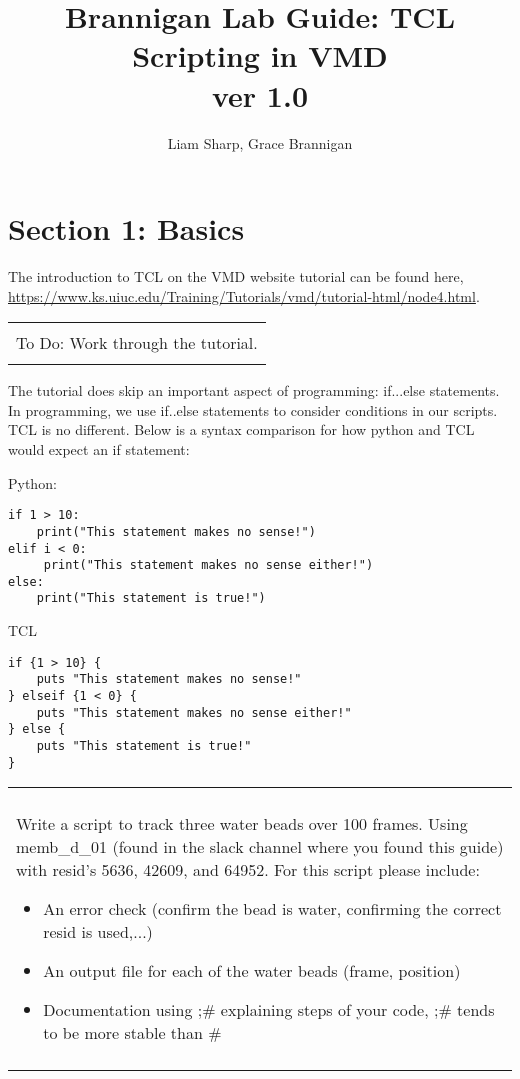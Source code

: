 \documentclass[letter,11pt]{article}
\title{{Brannigan Lab Guide: TCL Scripting in VMD }\\\large{ver 1.0}}
\author{Liam Sharp, Grace Brannigan}
\newenvironment{exercise}
    {\begin{center}
    \begin{tabular}{|p{0.9\textwidth}|}
    \hline\\
    }
    { 
    \\\\\hline
    \end{tabular} 
    \end{center}
    }
\begin{document}
 
\maketitle
\newpage
\tableofcontents
\flushbottom
\newpage
\section{Section 1: Basics}
\label{sec:intro}
The introduction to TCL on the VMD website tutorial can be found here, \url{https://www.ks.uiuc.edu/Training/Tutorials/vmd/tutorial-html/node4.html}.
\begin{exercise}
To Do: Work through the tutorial.  
\end{exercise}

The tutorial does skip an important aspect of programming: if...else statements. In programming, we use if..else statements to consider conditions in our scripts. TCL is no different. Below is a syntax comparison for how python and TCL would expect an if statement:

\vspace{0.15in}
Python:
\begin{lstlisting}
if 1 > 10:
    print("This statement makes no sense!")
elif i < 0:
     print("This statement makes no sense either!")
else:
    print("This statement is true!")
    \end{lstlisting}
    
TCL
\begin{lstlisting}
if {1 > 10} {
    puts "This statement makes no sense!"
} elseif {1 < 0} {
    puts "This statement makes no sense either!"
} else {
    puts "This statement is true!"
}
\end{lstlisting}

\begin{exercise}
Write a script to track three water beads over 100 frames. Using memb\_d\_01 (found in the slack channel where you found this guide) with resid's 5636, 42609, and 64952. For this script please include:
\begin{itemize}
\item An error check (confirm the bead is water, confirming the correct resid is used,...)
\item An output file for each of the water beads (frame, position)
\item Documentation using ;\# explaining steps of your code, ;\# tends to be more stable than \#
\end{itemize}
\end{exercise}
\end{document}
